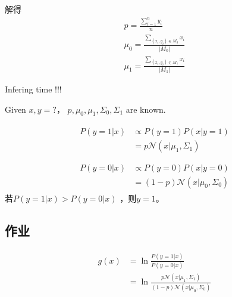 \documentclass[UTF8]{ctexart}
\begin{document}
解得
\begin{gather*}
    p = \frac{\sum_{i=1}^n y_i}{n} \\
    \mu_0 = \frac{\sum_{(x_i, y_i)\in M_0}x_i}{|M_0|} \\
    \mu_1 = \frac{\sum_{(x_i, y_i)\in M_1}x_i}{|M_1|} 
\end{gather*}

Infering time !!!

Given $x, y=?$， $p, \mu_0, \mu_1, \Sigma_0, \Sigma_1$ are known.

\begin{gather*}
    \begin{aligned}
        P(y=1|x) & \propto P(y=1)P(x|y=1) \\    
        &=p \mathcal{N}(x|\mu_1, \Sigma_1) \\
    \end{aligned}
    \\
    \begin{aligned}
        P(y=0|x) & \propto P(y=0)P(x|y=0) \\    
        &=(1-p) \mathcal{N}(x|\mu_0, \Sigma_0) 
    \end{aligned}
\end{gather*}
若$ P(y=1|x) >  P(y=0|x)$ ，则$y=1$。

\subsection{\textbf{作业} }
\begin{gather*}
    \begin{aligned}
        g(x) &=\ln{\frac{P(y=1|x)}{P(y=0|x)}} \\     
        &=\ln{\frac{p \mathcal{N}(x|\mu_1, \Sigma_1)}{(1-p) \mathcal{N}(x|\mu_0, \Sigma_0) }}
    \end{aligned}
\end{gather*}
\end{document}

